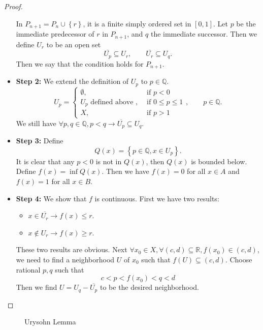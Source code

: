 \documentclass[../main.tex]{subfiles}
\begin{document}
\begin{proof}
\begin{itemize}
		In $P_{n+1} = P_n \cup \left\{ r \right\}$, it is a finite simply ordered set in $[0,1]$. Let $p$ be the immediate predecessor of $r$ in $P_{n+1}$, and $q$ the immediate successor. Then we define $U_r$ to be an open set
		\begin{equation*}
			\overline{U_p} \subseteq U_r, \qquad \overline{U_r} \subseteq U_q.
		\end{equation*}
		Then we say that the condition holds for $P_{n+1}$.
	\item \textbf{Step 2: } We extend the definition of $U_p$ to $p\in \mathbb{Q}$.
		\begin{equation*}
		U_p = 
		\begin{cases}
			\emptyset , &\text{ if } p<0 \\
			U_p \text{ defined above }, &\text{ if } 0\leq p \leq 1 \\			
			X, &\text{ if } p>1
		\end{cases}
		,\qquad p\in \mathbb{Q}.
		\end{equation*}
		We still have $\forall p,q\in \mathbb{Q}, p<q \rightarrow \overline{U_p} \subseteq U_q$.
	\item \textbf{Step 3: } Define
		\begin{equation*}
		Q(x) = \left\{ p\in \mathbb{Q}, x\in U_p \right\}.
		\end{equation*}
		It is clear that any $p<0$ is not in $Q(x)$, then $Q(x)$ is bounded below. Define $f(x) = \inf Q(x)$. Then we have $f(x)=0$ for all $x\in A$ and $f(x) = 1$ for all $x\in B$.
	\item \textbf{Step 4: } We show that $f$ is continuous. First we have two results:
		\begin{itemize}
		\item $x\in \overline{U_r} \rightarrow f(x) \leq r$.
		\item $x\notin U_r \rightarrow f(x) \geq r$.
		\end{itemize}
		These two results are obvious. Next $\forall x_0\in X, \forall (c,d) \subseteq \mathbb{R}, f(x_0) \in (c,d)$, we need to find a neighborhood $U$ of $x_0$ such that $f(U) \subseteq (c,d)$. Choose rational $p,q$ such that
		\begin{equation*}
		c<p<f(x_0)<q<d
		\end{equation*}
		Then we find $U = U_q-\overline{U_p}$ to be the desired neighborhood.
	\end{itemize}
\end{proof}

\begin{figure}[ht]
    \centering
    \caption{Urysohn Lemma}
    \label{fig:urysohn-lemma}
\end{figure}
\end{document}
